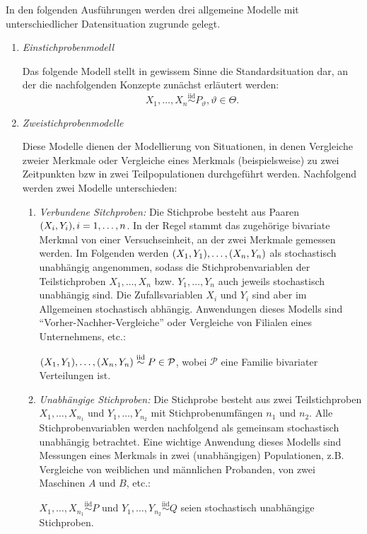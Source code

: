 \documentclass{lecture}
\begin{document}
    In den folgenden Ausführungen werden drei allgemeine Modelle mit unterschiedlicher Datensituation zugrunde gelegt.
    \begin{enumerate}[label=(\roman*)]
        \item \emph{Einstichprobenmodell}

        Das folgende Modell stellt in gewissem Sinne die Standardsituation dar, an der die nachfolgenden Konzepte zunächst erläutert werden:
        \[
            X_1, \ldots, X_n \stackrel{\text{iid}}{\sim} P_\vartheta, \vartheta \in \Theta.
        \]
        \item \emph{Zweistichprobenmodelle}

        Diese Modelle dienen der Modellierung von Situationen, in denen Vergleiche zweier Merkmale oder Vergleiche eines Merkmals (beispielsweise) zu zwei Zeitpunkten bzw in zwei Teilpopulationen durchgeführt werden.
        Nachfolgend werden zwei Modelle unterschieden:
        \begin{enumerate}[label=\alph*)]
            \item \emph{Verbundene Sitchproben:} Die Stichprobe besteht aus Paaren \(\parentheses*{X_i, Y_i}, i = 1, \ldots, n\).
            In der Regel stammt das zugehörige bivariate Merkmal von einer Versuchseinheit, an der zwei Merkmale gemessen werden.
            Im Folgenden werden \(\parentheses*{X_1, Y_1}, \ldots, \parentheses*{X_n, Y_n}\) als stochastisch unabhängig angenommen, sodass die Stichprobenvariablen der Teilstichproben \(X_1, \ldots, X_n\) bzw. \(Y_1, \ldots, Y_n\) auch jeweils stochastisch unabhängig sind.
            Die Zufallsvariablen \(X_i\) und \(Y_i\) sind aber im Allgemeinen stochastisch abhängig.
            Anwendungen dieses Modells sind ``Vorher-Nachher-Vergleiche'' oder Vergleiche von Filialen eines Unternehmens, etc.:

            \(\parentheses*{X_1, Y_1}, \ldots, \parentheses*{X_n, Y_n} \stackrel{\text{iid}}{\sim} P \in \mathcal{P}\), wobei \(\mathcal{P}\) eine Familie bivariater Verteilungen ist.
            \item \emph{Unabhängige Stichproben:} Die Stichprobe besteht aus zwei Teilstichproben \(X_1, \ldots, X_{n_1}\) und \(Y_1, \ldots, Y_{n_2}\) mit Stichprobenumfängen \(n_1\) und \(n_2\).
            Alle Stichprobenvariablen werden nachfolgend als gemeinsam stochastisch unabhängig betrachtet.
            Eine wichtige Anwendung dieses Modells sind Messungen eines Merkmals in zwei (unabhängigen) Populationen, z.B. Vergleiche von weiblichen und männlichen Probanden, von zwei Maschinen \(A\) und \(B\), etc.:

            \(X_1, \ldots, X_{n_1} \stackrel{\text{iid}}{\sim} P\) und \(Y_1, \ldots, Y_{n_2} \stackrel{\text{iid}}{\sim} Q\) seien stochastisch unabhängige Stichproben.
        \end{enumerate}
    \end{enumerate}
\end{document}
